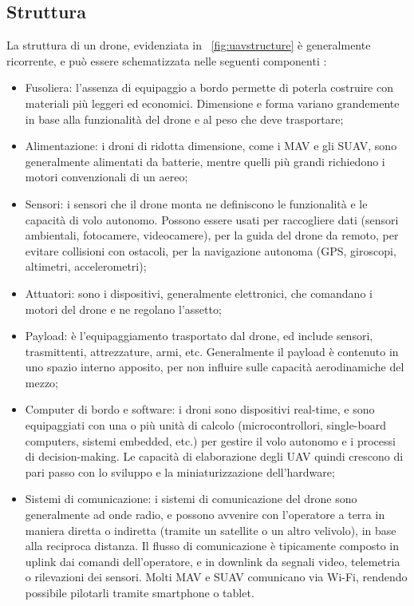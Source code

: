 \subsection[Struttura]{Struttura}
La struttura di un drone, evidenziata in \figurename\ \ref{fig:uavstructure} è generalmente ricorrente, e può essere schematizzata nelle seguenti componenti \cite{Sahingoz2014}:

\begin{itemize}
	\item Fusoliera: l'assenza di equipaggio a bordo permette di poterla costruire con materiali più leggeri ed economici. Dimensione e forma variano grandemente in base alla funzionalità del drone e al peso che deve trasportare;
	\item Alimentazione: i droni di ridotta dimensione, come i MAV e gli SUAV, sono generalmente alimentati da batterie, mentre quelli più grandi richiedono i motori convenzionali di un aereo;
	\item Sensori: i sensori che il drone monta ne definiscono le funzionalità e le capacità di volo autonomo. Possono essere usati per raccogliere dati (sensori ambientali, fotocamere, videocamere), per la guida del drone da remoto, per evitare collisioni con ostacoli, per la navigazione autonoma (GPS, giroscopi, altimetri, accelerometri);
	\item Attuatori: sono i dispositivi, generalmente elettronici, che comandano i motori del drone e ne regolano l'assetto;
	\item Payload: è l'equipaggiamento trasportato dal drone, ed include sensori, trasmittenti, attrezzature, armi, etc. Generalmente il payload è contenuto in uno spazio interno apposito, per non influire sulle capacità aerodinamiche del mezzo;
	\item Computer di bordo e software: i droni sono dispositivi real-time, e sono equipaggiati con una o più unità di calcolo (microcontrollori, single-board computers, sistemi embedded, etc.)  per gestire il volo autonomo e i processi di decision-making. Le capacità di elaborazione degli UAV quindi crescono di pari passo con lo sviluppo e la miniaturizzazione dell'hardware;
	\item Sistemi di comunicazione: i sistemi di comunicazione del drone sono generalmente ad onde radio, e possono avvenire con l'operatore a terra in maniera diretta o indiretta (tramite un satellite o un altro velivolo), in base alla reciproca distanza. Il flusso di comunicazione è tipicamente composto in uplink dai comandi dell'operatore, e in downlink da segnali video, telemetria o rilevazioni dei sensori. Molti  MAV e SUAV comunicano via Wi-Fi, rendendo possibile pilotarli tramite smartphone o tablet.  
\end{itemize}

